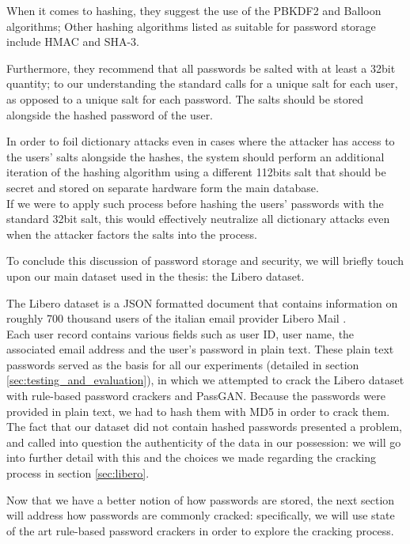 When it comes to hashing, they suggest the use of the PBKDF2 and Balloon algorithms; Other hashing algorithms listed as suitable for password storage include HMAC and SHA-3.

Furthermore, they recommend that all passwords be salted with at least a 32bit quantity; to our understanding the standard calls for a unique salt for each user, as opposed to a unique salt for each password. The salts should be stored alongside the hashed password of the user.

In order to foil dictionary attacks even in cases where the attacker has access to the users' salts alongside the hashes, the system should perform an additional iteration of the hashing algorithm using a different 112bits salt that should be secret and stored on separate hardware form the main database.\\
If we were to apply such process before hashing the users' passwords with the standard 32bit salt, this would effectively neutralize all dictionary attacks even when the attacker factors the salts into the process.

To conclude this discussion of password storage and security, we will briefly touch upon our main dataset used in the thesis: the Libero dataset.

The Libero dataset is a JSON formatted document that contains information on roughly 700 thousand users of the italian email provider Libero Mail \cite{libero_leak}.\\
Each user record contains various fields such as  user ID, user name, the associated email address and the user's password in plain text.
These plain text passwords served as the basis for all our experiments (detailed in section \ref{sec:testing_and_evaluation}), in which we attempted to crack the Libero dataset with rule-based password crackers and PassGAN. Because the passwords were provided in plain text, we had to hash them with MD5 in order to crack them.
The fact that our dataset did not contain hashed passwords presented a problem, and called into question the authenticity of the data in our possession: we will go into further detail with this  and the choices we made regarding the cracking process in section \ref{sec:libero}.  

Now that we have a better notion of how passwords are stored, the next section will address how passwords are commonly cracked: specifically, we will use state of the art rule-based password crackers in order to explore the cracking process. %


